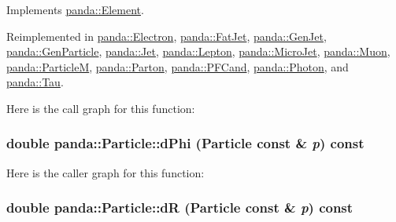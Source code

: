 Implements \hyperlink{classpanda_1_1Element_a1309a7039cde6233c19f3c488805015d}{panda::Element}.

Reimplemented in \hyperlink{classpanda_1_1Electron_af73c3c5f59267c4bba4ceb0a47cfc6ec}{panda::Electron}, \hyperlink{classpanda_1_1FatJet_ad63603b0bd69d4e3b6173a194b3e6829}{panda::FatJet}, \hyperlink{classpanda_1_1GenJet_a519508188c474ac1dcc2c822de9e43c3}{panda::GenJet}, \hyperlink{classpanda_1_1GenParticle_a41d0169feced73ebddb43bf9547cecdf}{panda::GenParticle}, \hyperlink{classpanda_1_1Jet_a494d27c6c2b773f5849996944cf46eb2}{panda::Jet}, \hyperlink{classpanda_1_1Lepton_a2d3b49322244947c933645bbdb44bf88}{panda::Lepton}, \hyperlink{classpanda_1_1MicroJet_ae7b83b860f85cc86b736495317fb7f3a}{panda::MicroJet}, \hyperlink{classpanda_1_1Muon_a5a1c65b72491bc9df325bc182568e40c}{panda::Muon}, \hyperlink{classpanda_1_1ParticleM_a042f9e295576be022960ea88144e9022}{panda::ParticleM}, \hyperlink{classpanda_1_1Parton_a4471a7ad47570d85d6cd5ffa3c67b4d2}{panda::Parton}, \hyperlink{classpanda_1_1PFCand_a263dcf1e5a9b704827d4b4af006ebcf4}{panda::PFCand}, \hyperlink{classpanda_1_1Photon_a8fbe4f60488cc95024bd4a50b6df6b95}{panda::Photon}, and \hyperlink{classpanda_1_1Tau_a96eda4638f1fd6968f3a31757253600e}{panda::Tau}.

Here is the call graph for this function:\hypertarget{classpanda_1_1Particle_ad58d76aa3509890401e7075d36d605b2}{
\subsubsection[{dPhi}]{\setlength{\rightskip}{0pt plus 5cm}double panda::Particle::dPhi ({\bf Particle} const \& {\em p}) const}}
\label{classpanda_1_1Particle_ad58d76aa3509890401e7075d36d605b2}


Here is the caller graph for this function:\hypertarget{classpanda_1_1Particle_adbc50bce85d9da56699bbd7d9ab1e4bf}{
\subsubsection[{dR}]{\setlength{\rightskip}{0pt plus 5cm}double panda::Particle::dR ({\bf Particle} const \& {\em p}) const}}
\label{classpanda_1_1Particle_adbc50bce85d9da56699bbd7d9ab1e4bf}


